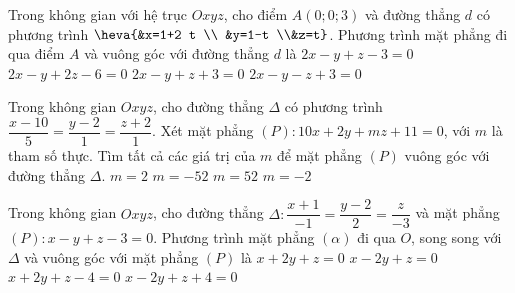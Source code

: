 \begin{ex}%
	Trong không gian với hệ trục $Oxyz$, cho điểm $A(0;0;3)$ và đường thẳng $d$ có phương trình $ \heva{&x=1+2 t \\ &y=1-t \\&z=t}$. Phương trình mặt phẳng đi qua điểm $A$ và vuông góc với đường thẳng $d$ là
	\choice
		{\True $2x-y+z-3=0$}
		{$2x-y+2 z-6=0$}
		{$2x-y+z+3=0$}
		{$2x-y-z+3=0$}
\end{ex}

\begin{ex}%
	Trong không gian $Oxyz$, cho đường thẳng $\Delta$ có phương trình $\dfrac{x-10}{5}=\dfrac{y-2}{1}=\dfrac{z+2}{1}$. Xét mặt phẳng $(P)\colon 10x+2y+m z+11=0$, với $m$ là tham số thực. Tìm tất cả các giá trị của $m$ để mặt phẳng $(P)$ vuông góc với đường thẳng $\Delta$.
	\choice 
		{\True $m=2$}
		{$m=-52$}
		{$m=52$}
		{$m=-2$}
\end{ex}

\begin{ex}%
	Trong không gian $Oxyz$, cho đường thẳng $\Delta\colon \dfrac{x+1}{-1}=\dfrac{y-2}{2}=\dfrac{z}{-3}$ và mặt phẳng $(P)\colon x-y+z-3=0$. Phương trình mặt phẳng $(\alpha)$ đi qua $O$, song song với $\Delta$ và vuông góc với mặt phẳng $(P)$ là
	\choice 
		{\True $x+2 y+z=0$}
		{$x-2 y+z=0$}
		{$x+2 y+z-4=0$}
		{$x-2 y+z+4=0$}
\end{ex}